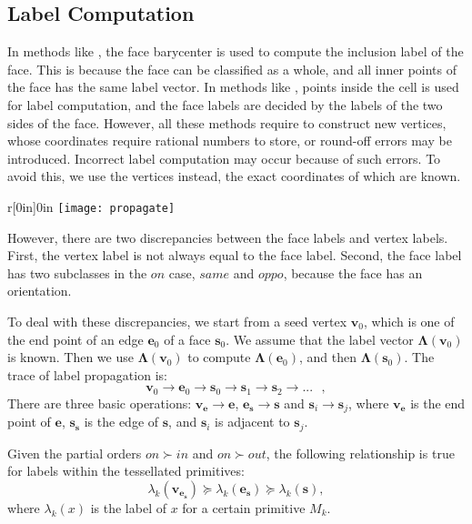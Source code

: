 \subsection{Label Computation}
\label{sec:propagation}

In methods like \cite{feito2013fast,ogayar2015deferred}, the face barycenter is used to compute the inclusion label of the face. This is because the face can be classified as a whole, and all inner points of the face has the same label vector. In methods like \cite{zhou2016mesh}, points inside the cell is used for label computation, and the face labels are decided by the labels of the two sides of the face. However, all these methods require to construct new vertices, whose coordinates require rational numbers to store, or round-off errors may be introduced. Incorrect label computation may occur because of such errors. To avoid this, we use the vertices instead, the exact coordinates of which are known.

\begin{wrapfigure}{r}[0in]{0in}
\texttt{[image: propagate]}
\end{wrapfigure}


However, there are two discrepancies between the face labels and vertex labels. First, the vertex label is not always equal to the face label. Second, the face label has two subclasses in the $on$ case, $same$ and $oppo$, because the face has an orientation.

To deal with these discrepancies, we start from a seed vertex $\bm{v}_0$, which is one of the end point of an edge $\bm{e}_0$ of a face $\bm{s}_0$. We assume that the label vector $\bm{\Lambda}(\bm{v}_0)$ is known.
Then we use $\bm{\Lambda}(\bm{v}_0)$ to compute $\bm{\Lambda}(\bm{e}_0)$, and then $\bm{\Lambda}(\bm{s}_0)$. The trace of label propagation is:
\begin{equation}
\bm{v}_0\to \bm{e}_0\to \bm{s}_0\to \bm{s}_1\to \bm{s}_2\to ...~~~,
\end{equation}
There are three basic operations: $\bm{v}_{\bm{e}}\to \bm{e}$, $\bm{e}_{\bm{s}}\to \bm{s}$ and $\bm{s}_i\to \bm{s}_j$, where $\bm{v}_{\bm{e}}$ is the end point of $\bm{e}$,
$\bm{s}_{\bm{s}}$ is the edge of $\bm{s}$,
and $\bm{s}_i$ is adjacent to $\bm{s}_j$.

\begin{theorem}
  \label{thm:porder}
  Given the partial orders $on \succ in$ and $on \succ out$, the following relationship is true for labels within the tessellated primitives:
  \begin{equation}
    \lambda_k(\bm{v}_{\bm{e}_{\bm{s}}}) \succeq \lambda_k(\bm{e}_{\bm{s}}) \succeq \lambda_k(\bm{s}),
  \end{equation}
  where $\lambda_k(x)$ is the label of $x$ for a certain primitive $M_k$.
\end{theorem}

